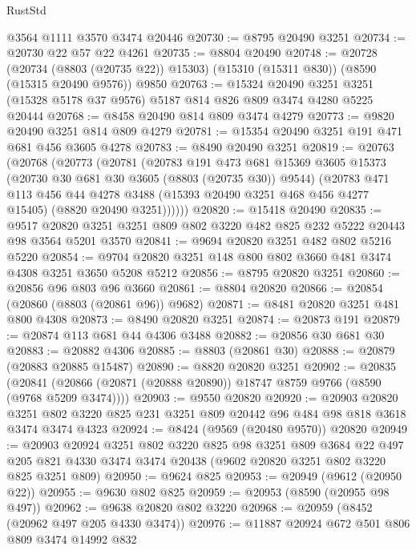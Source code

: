 \begin{lexlean}{RustStd}
\begin{coremodule}
    @3564
    @1111
    @3570
    @3474
    @20446
@20730 := @8795 @20490 @3251
@20734 := @20730 @22 @57 @22 @4261
@20735 := @8804 @20490
@20748 := @20728
    (@20734 (@8803 (@20735 @22)) @15303)
    (@15310 (@15311 @830))
    (@8590 (@15315 @20490 @9576))
    @9850
@20763 := @15324
    @20490
    @3251
    @3251
    (@15328 @5178 @37 @9576)
    @5187
    @814
    @826
    @809
    @3474
    @4280
    @5225
    @20444
@20768 := @8458 @20490 @814 @809 @3474 @4279
@20773 := @9820 @20490 @3251 @814 @809 @4279
@20781 := @15354 @20490 @3251 @191 @471 @681 @456 @3605 @4278
@20783 := @8490 @20490 @3251
@20819 := @20763
    (@20768
      (@20773
        (@20781
          (@20783
            @191
            @473
            @681
            @15369
            @3605
            @15373
            (@20730 @30 @681 @30 @3605 (@8803 (@20735 @30)) @9544)
            (@20783
              @471
              @113
              @456
              @44
              @4278
              @3488
              (@15393 @20490 @3251 @468 @456 @4277 @15405)
              (@8820 @20490 @3251))))))
@20820 := @15418 @20490
@20835 := @9517 @20820 @3251 @3251 @809 @802 @3220 @482 @825 @232 @5222 @20443 @98 @3564 @5201 @3570
@20841 := @9694 @20820 @3251 @482 @802 @5216 @5220
@20854 := @9704 @20820 @3251 @148 @800 @802 @3660 @481 @3474 @4308 @3251 @3650 @5208 @5212
@20856 := @8795 @20820 @3251
@20860 := @20856 @96 @803 @96 @3660
@20861 := @8804 @20820
@20866 := @20854 (@20860 (@8803 (@20861 @96)) @9682)
@20871 := @8481 @20820 @3251 @481 @800 @4308
@20873 := @8490 @20820 @3251
@20874 := @20873 @191
@20879 := @20874 @113 @681 @44 @4306 @3488
@20882 := @20856 @30 @681 @30
@20883 := @20882 @4306
@20885 := @8803 (@20861 @30)
@20888 := @20879 (@20883 @20885 @15487)
@20890 := @8820 @20820 @3251
@20902 := @20835
    (@20841 (@20866 (@20871 (@20888 @20890)) @18747 @8759 @9766 (@8590 (@9768 @5209 @3474))))
@20903 := @9550 @20820
@20920 := @20903
    @20820
    @3251
    @802
    @3220
    @825
    @231
    @3251
    @809
    @20442
    @96
    @484
    @98
    @818
    @3618
    @3474
    @3474
    @4323
@20924 := @8424 (@9569 (@20480 @9570)) @20820
@20949 := @20903
    @20924
    @3251
    @802
    @3220
    @825
    @98
    @3251
    @809
    @3684
    @22
    @497
    @205
    @821
    @4330
    @3474
    @3474
    @20438
    (@9602 @20820 @3251 @802 @3220 @825 @3251 @809)
@20950 := @9624 @825
@20953 := @20949 (@9612 (@20950 @22))
@20955 := @9630 @802 @825
@20959 := @20953 (@8590 (@20955 @98 @497))
@20962 := @9638 @20820 @802 @3220
@20968 := @20959 (@8452 (@20962 @497 @205 @4330 @3474))
@20976 := @11887 @20924 @672 @501 @806 @809 @3474 @14992 @832

\end{coremodule}
\end{lexlean}
